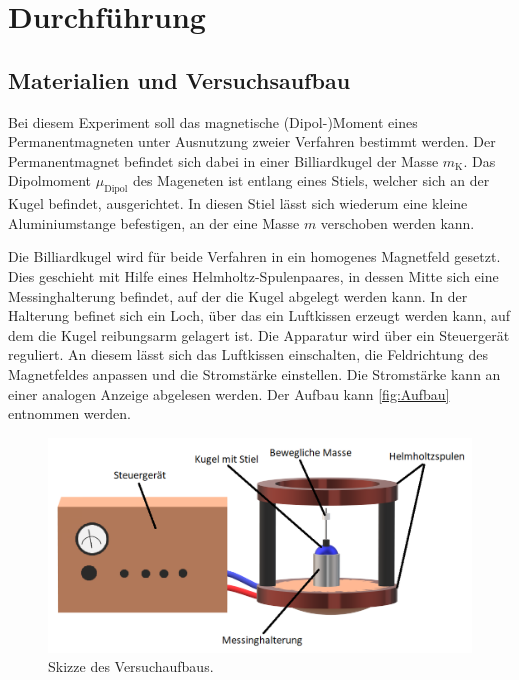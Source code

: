 \section{Durchführung}
\label{sec:Durchführung}

\subsection{Materialien und Versuchsaufbau}
Bei diesem Experiment soll das magnetische (Dipol-)Moment eines Permanentmagneten unter Ausnutzung zweier Verfahren bestimmt werden.
Der Permanentmagnet befindet sich dabei in einer Billiardkugel der Masse $m_{\text{K}}$. Das Dipolmoment $\mu_{\text{Dipol}}$ des Mageneten ist entlang eines Stiels,
welcher sich an der Kugel befindet, ausgerichtet. In diesen Stiel lässt sich wiederum eine kleine Aluminiumstange befestigen, an der eine Masse $m$ verschoben werden kann.


Die Billiardkugel wird für beide Verfahren in ein homogenes Magnetfeld gesetzt. Dies geschieht mit Hilfe eines Helmholtz-Spulenpaares, in dessen Mitte sich eine
Messinghalterung befindet, auf der die Kugel abgelegt werden kann. In der Halterung befinet sich ein Loch, über das ein \glqq Luftkissen\grqq \: erzeugt werden kann, auf dem
die Kugel reibungsarm gelagert ist. Die Apparatur wird über ein Steuergerät reguliert. An diesem lässt sich das Luftkissen einschalten, die Feldrichtung
des Magnetfeldes anpassen und die Stromstärke einstellen. Die Stromstärke kann an einer analogen Anzeige abgelesen werden. Der Aufbau kann \autoref{fig:Aufbau} entnommen werden.

\begin{figure}
    \centering
    \includegraphics[width=\textwidth]{content/AufbauSkizze.png}
	\caption{Skizze des Versuchaufbaus. \cite{paint3d}}
	\label{fig:Aufbau}
\end{figure}

